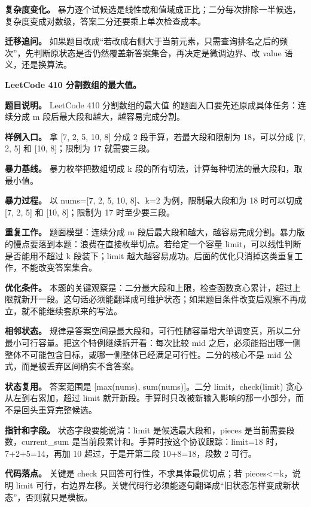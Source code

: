 \textbf{复杂度变化。} 暴力逐个试候选是线性或和值域成正比；二分每次排除一半候选，复杂度变成对数级，答案二分还要乘上单次检查成本。

\textbf{迁移追问。} 如果题目改成“若改成右侧大于当前元素，只需查询排名之后的频次”，先判断原状态是否仍然覆盖新答案集合，再决定是微调边界、改 value 语义，还是换算法。

\noindent\textbf{LeetCode 410 分割数组的最大值。}

\textbf{题目说明。} LeetCode 410 分割数组的最大值 的题面入口要先还原成具体任务：连续分成 m 段后最大段和越大，越容易完成分割。

\textbf{样例入口。} 拿 [7, 2, 5, 10, 8] 分成 2 段手算，若最大段和限制为 18，可以分成 [7, 2, 5] 和 [10, 8]；限制为 17 就需要三段。

\textbf{暴力基线。} 暴力枚举把数组切成 k 段的所有切法，计算每种切法的最大段和，取最小值。

\textbf{暴力过程。} 以 nums=[7, 2, 5, 10, 8]、k=2 为例，限制最大段和为 18 时可以切成 [7, 2, 5] 和 [10, 8]；限制为 17 时至少要三段。

\textbf{重复工作。} 题面模型：连续分成 m 段后最大段和越大，越容易完成分割。暴力版的慢点要落到本题：浪费在直接枚举切点。若给定一个容量 limit，可以线性判断是否能用不超过 k 段装下；limit 越大越容易成功。后面的优化只消掉这类重复工作，不能改变答案集合。

\textbf{优化条件。} 本题的关键观察是：二分最大段和上限，检查函数贪心累计，超过上限就新开一段。这句话必须能翻译成可维护状态；如果题目条件改变后观察不再成立，就不能继续套原来的写法。

\textbf{相邻状态。} 规律是答案空间是最大段和，可行性随容量增大单调变真，所以二分最小可行容量。把这个特例继续拆开看：每次比较 mid 之后，必须能指出哪一侧整体不可能包含目标，或哪一侧整体已经满足可行性。二分的核心不是 mid 公式，而是被丢弃区间确实不含答案。

\textbf{状态复用。} 答案范围是 [max(nums), sum(nums)]。二分 limit，check(limit) 贪心从左到右累加，超过 limit 就开新段。手算时只改被新输入影响的那一小部分，而不是回头重算完整候选。

\textbf{指针和字段。} 状态字段要能说清：limit 是候选最大段和，pieces 是当前需要段数，current\_sum 是当前段累计和。手算时按这个协议跟踪：limit=18 时，7+2+5=14，再加 10 超过，于是开第二段 10+8=18，段数 2 可行。

\textbf{代码落点。} 关键是 check 只回答可行性，不求具体最优切点；若 pieces<=k，说明 limit 可行，右边界左移。关键代码行必须能逐句翻译成“旧状态怎样变成新状态”，否则就只是模板。

